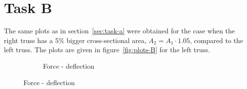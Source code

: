 \section{Task B}
\label{sec:task-b}

The same plots as in section~\ref{sec:task-a} were obtained for the case
when the right truss has a 5\% bigger cross-sectional area,
\(A_{2} = A_{1} \cdot 1.05\), compared to the left truss.
The plots are given in figure~\ref{fig:plots-B} for the left truss.
\begin{figure}[th]
  \centering
  \begin{subfigure}[t]{\textwidth}
    \caption{Force - deflection}
  \end{subfigure}


\end{figure}
